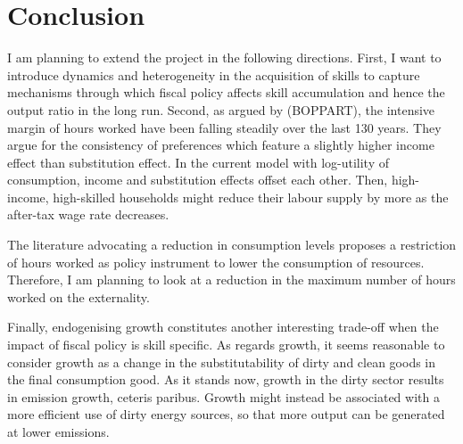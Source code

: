 \section{Conclusion}\label{sec:con}

I am planning to extend the project in the following directions.
First, I want to introduce dynamics and heterogeneity in the acquisition of skills to capture mechanisms through which fiscal policy affects skill accumulation and hence the output ratio in the long run. Second, as argued by (BOPPART), the intensive margin of hours worked have been falling steadily over the last 130 years. They argue for the consistency of preferences which feature a slightly higher income effect than substitution effect. In the current model with log-utility of consumption, income and substitution effects offset each other. Then, high-income, high-skilled households might reduce their labour supply by more as the after-tax wage rate decreases. 

The literature advocating a reduction in consumption levels proposes a restriction of hours worked as policy instrument to lower the consumption of resources. Therefore, I am planning to look at a reduction in the maximum number of hours worked on the externality. 

Finally, endogenising growth constitutes another interesting trade-off when the impact of fiscal policy is skill specific. 
As regards growth, it seems reasonable to consider growth as a change in the substitutability of dirty and clean goods in the final consumption good. As it stands now, growth in the dirty sector results in emission growth, ceteris paribus. Growth might instead be associated with a more efficient use of dirty energy sources, so that more output can be generated at lower emissions.


